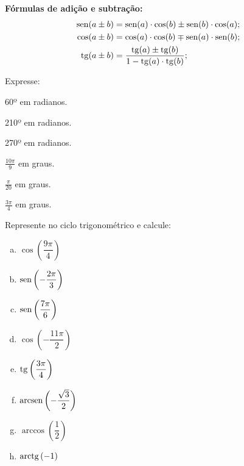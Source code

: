  \textbf{Fórmulas de adição e subtração:}
 \begin{align*}
  \operatorname{sen}(a\pm b)&=\operatorname{sen}(a)\cdot \cos(b)\pm\operatorname{sen}(b)\cdot \cos(a); \\
  \cos(a\pm b)&=\cos(a)\cdot \cos(b)\mp\operatorname{sen}(a)\cdot \operatorname{sen}(b); \\
  \operatorname{tg}(a\pm b)&= \frac{\operatorname{tg}(a)\pm\operatorname{tg}(b)}{1-\operatorname{tg}(a)\cdot \operatorname{tg}(b)};
 \end{align*}


\begin{secExercicios}

\begin{exer}
Expresse:
\begin{enumerate}[a)]
\begin{multicols}{2}
    \item 60º em radianos.
    \item 210º em radianos.
    \item 270º em radianos.
    \item $\frac{10\pi}{9}$ em graus.
    \item $\frac{\pi}{20}$ em graus.
    \item $\frac{3\pi}{4}$ em graus. 
\end{multicols}   
\end{enumerate}
\end{exer}

\begin{exer}
Represente no ciclo trigonométrico e calcule:
\begin{multicols}{2}
\begin{enumerate}[a)]
\item $\cos\left(\dfrac{9\pi}{4}\right)$
\item $\operatorname{sen}\left(-\dfrac{2\pi}{3}\right)$
\item $\operatorname{sen}\left(\dfrac{7\pi}{6}\right)$
\item $\cos\left(-\dfrac{11\pi}{2}\right)$
\item $\operatorname{tg}\left(\dfrac{3\pi}{4}\right)$
\item $\operatorname{arcsen}\left(-\dfrac{\sqrt{3}}{2}\right)$
\item $\arccos\left(\dfrac{1}{2}\right)$
\item $\operatorname{arctg}\left(-1\right)$
\end{enumerate}
\end{multicols}    
\end{exer}


\end{secExercicios}
